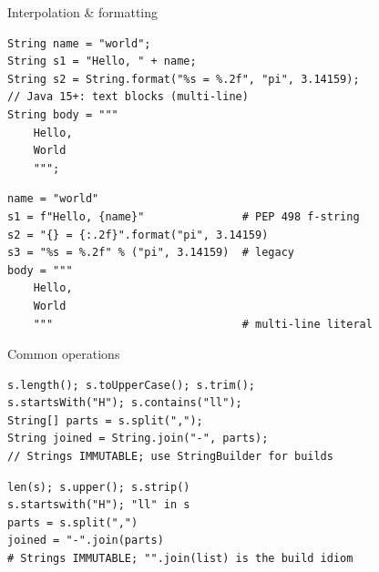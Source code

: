 \documentclass[10pt]{article}
\begin{document}
\begin{construct}{Interpolation \& formatting}
\noindent
\begin{minipage}[t]{0.485\linewidth}
\begin{lstlisting}[style=java, title=Java]
String name = "world";
String s1 = "Hello, " + name;
String s2 = String.format("%s = %.2f", "pi", 3.14159);
// Java 15+: text blocks (multi-line)
String body = """
    Hello,
    World
    """;
\end{lstlisting}
\end{minipage}\hfill
\begin{minipage}[t]{0.485\linewidth}
\begin{lstlisting}[style=python, title=Python]
name = "world"
s1 = f"Hello, {name}"               # PEP 498 f-string
s2 = "{} = {:.2f}".format("pi", 3.14159)
s3 = "%s = %.2f" % ("pi", 3.14159)  # legacy
body = """
    Hello,
    World
    """                             # multi-line literal
\end{lstlisting}
\end{minipage}
\end{construct}

\begin{construct}{Common operations}
\noindent
\begin{minipage}[t]{0.485\linewidth}
\begin{lstlisting}[style=java, title=Java]
s.length(); s.toUpperCase(); s.trim();
s.startsWith("H"); s.contains("ll");
String[] parts = s.split(",");
String joined = String.join("-", parts);
// Strings IMMUTABLE; use StringBuilder for builds
\end{lstlisting}
\end{minipage}\hfill
\begin{minipage}[t]{0.485\linewidth}
\begin{lstlisting}[style=python, title=Python]
len(s); s.upper(); s.strip()
s.startswith("H"); "ll" in s
parts = s.split(",")
joined = "-".join(parts)
# Strings IMMUTABLE; "".join(list) is the build idiom
\end{lstlisting}
\end{minipage}
\end{construct}

\end{document}
